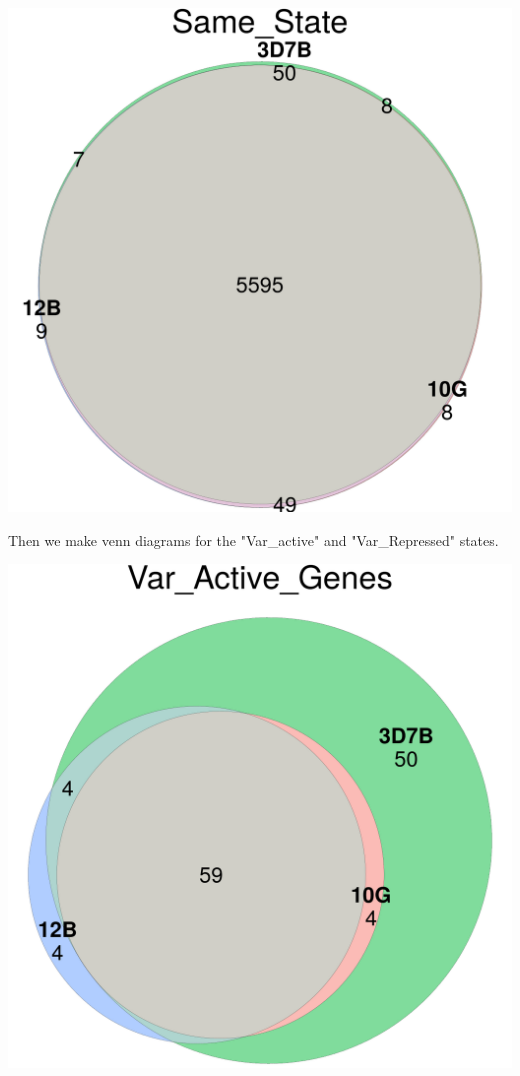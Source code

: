 \documentclass[11pt]{article}
\begin{document}
\begin{center}
\includegraphics[width=.9\linewidth]{./Plots/venn_Same_State.png}
\end{center}

Then we make venn diagrams for the "Var\_active" and "Var\_Repressed" states.

\begin{center}
\includegraphics[width=.9\linewidth]{./Plots/venn_Var_Active_Genes.png}
\end{center}
\end{document}
